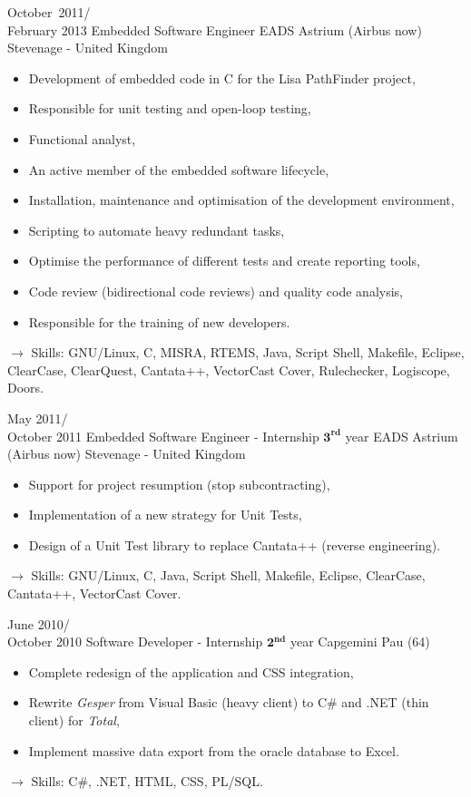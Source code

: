 \documentclass[11pt,a4paper,sans]{moderncv}
\begin{document}
\cventry
{October\ 2011/\\February 2013}
{Embedded Software Engineer}
{EADS Astrium (Airbus now)}
{Stevenage - United Kingdom}
{}
{\begin{itemize}
    \item Development of embedded code in C for the Lisa PathFinder project,
    \item Responsible for unit testing and open-loop testing,
    \item Functional analyst,
    \item An active member of the embedded software lifecycle,
    \item Installation, maintenance and optimisation of the development environment,
    \item Scripting to automate heavy redundant tasks,
    \item Optimise the performance of different tests and create reporting tools,
    \item Code review (bidirectional code reviews) and quality code analysis,
    \item Responsible for the training of new developers.
\end{itemize}
$\rightarrow$ Skills: GNU/Linux, C, MISRA, RTEMS, Java, Script Shell, Makefile, Eclipse, ClearCase, ClearQuest, Cantata++, VectorCast Cover, Rulechecker, Logiscope, Doors.
}   %

\cventry
{May 2011/\\October 2011}
{Embedded Software Engineer - Internship $\mathbf{3^{rd}}$ year}
{EADS Astrium (Airbus now)}
{Stevenage - United Kingdom}
{}
{\begin{itemize}
    \item Support for project resumption (stop subcontracting),
    \item Implementation of a new strategy for Unit Tests,
    \item Design of a Unit Test library to replace Cantata++ (reverse engineering).
\end{itemize}
$\rightarrow$ Skills: GNU/Linux, C, Java, Script Shell, Makefile, Eclipse, ClearCase, Cantata++, VectorCast Cover.
}   %

\cventry
{June 2010/\\October 2010}
{Software Developer - Internship $\mathbf{2^{nd}}$ year}
{Capgemini}
{Pau (64)}
{}
{\begin{itemize}
    \item Complete redesign of the application and CSS integration,
    \item Rewrite \emph{Gesper} from Visual Basic (heavy client) to C\# and .NET (thin client) for \emph{Total},
    \item Implement massive data export from the oracle database to Excel.
\end{itemize}
$\rightarrow$ Skills: C\#, .NET, HTML, CSS, PL/SQL.
}   %
\end{document}
